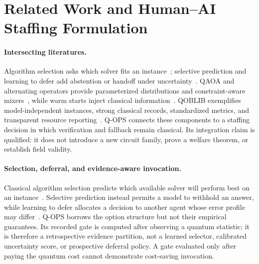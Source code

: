 \section{Related Work and Human--AI Staffing Formulation}
\label{sec:formulation}

\paragraph{Intersecting literatures.}
Algorithm selection asks which solver fits an instance~\citep{rice1976algorithm,kotthoff2014algorithm}; selective prediction and learning to defer add abstention or handoff under uncertainty~\citep{geifman2017selective,madras2018defer}. QAOA and alternating operators provide parameterized distributions and constraint-aware mixers~\citep{farhi2014qaoa,hadfield2019alternating}, while warm starts inject classical information~\citep{egger2021warm}. QOBLIB exemplifies model-independent instances, strong classical records, standardized metrics, and transparent resource reporting~\citep{koch2026qoblib}. Q-OPS connects these components to a staffing decision in which verification and fallback remain classical. Its integration claim is qualified: it does not introduce a new circuit family, prove a welfare theorem, or establish field validity.

\paragraph{Selection, deferral, and evidence-aware invocation.}
Classical algorithm selection predicts which available solver will perform best on an instance~\citep{rice1976algorithm,kotthoff2014algorithm}. Selective prediction instead permits a model to withhold an answer, while learning to defer allocates a decision to another agent whose error profile may differ~\citep{geifman2017selective,madras2018defer}. Q-OPS borrows the option structure but not their empirical guarantees. Its recorded gate is computed after observing a quantum statistic; it is therefore a retrospective evidence partition, not a learned selector, calibrated uncertainty score, or prospective deferral policy. A gate evaluated only after paying the quantum cost cannot demonstrate cost-saving invocation.

